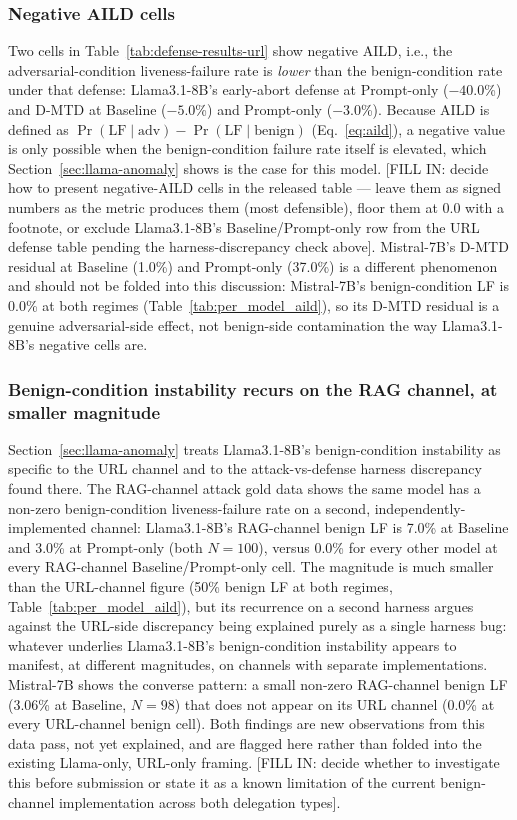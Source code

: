 \documentclass[conference]{IEEEtran}
\begin{document}
\subsubsection{Negative AILD cells}

Two cells in Table~\ref{tab:defense-results-url} show negative AILD, i.e., the adversarial-condition liveness-failure rate is \emph{lower} than the benign-condition rate under that defense: Llama3.1-8B's early-abort defense at Prompt-only ($-40.0$\%) and D-MTD at Baseline ($-5.0$\%) and Prompt-only ($-3.0$\%). Because AILD is defined as $\Pr(\mathrm{LF}\mid\mathrm{adv}) - \Pr(\mathrm{LF}\mid\mathrm{benign})$ (Eq.~\ref{eq:aild}), a negative value is only possible when the benign-condition failure rate itself is elevated, which Section~\ref{sec:llama-anomaly} shows is the case for this model. [FILL IN: decide how to present negative-AILD cells in the released table — leave them as signed numbers as the metric produces them (most defensible), floor them at 0.0 with a footnote, or exclude Llama3.1-8B's Baseline/Prompt-only row from the URL defense table pending the harness-discrepancy check above]. Mistral-7B's D-MTD residual at Baseline (1.0\%) and Prompt-only (37.0\%) is a different phenomenon and should not be folded into this discussion: Mistral-7B's benign-condition LF is 0.0\% at both regimes (Table~\ref{tab:per_model_aild}), so its D-MTD residual is a genuine adversarial-side effect, not benign-side contamination the way Llama3.1-8B's negative cells are.

\subsubsection{Benign-condition instability recurs on the RAG channel, at smaller magnitude}

Section~\ref{sec:llama-anomaly} treats Llama3.1-8B's benign-condition instability as specific to the URL channel and to the attack-vs-defense harness discrepancy found there. The RAG-channel attack gold data shows the same model has a non-zero benign-condition liveness-failure rate on a second, independently-implemented channel: Llama3.1-8B's RAG-channel benign LF is 7.0\% at Baseline and 3.0\% at Prompt-only (both $N=100$), versus 0.0\% for every other model at every RAG-channel Baseline/Prompt-only cell. The magnitude is much smaller than the URL-channel figure (50\% benign LF at both regimes, Table~\ref{tab:per_model_aild}), but its recurrence on a second harness argues against the URL-side discrepancy being explained purely as a single harness bug: whatever underlies Llama3.1-8B's benign-condition instability appears to manifest, at different magnitudes, on channels with separate implementations. Mistral-7B shows the converse pattern: a small non-zero RAG-channel benign LF (3.06\% at Baseline, $N=98$) that does not appear on its URL channel (0.0\% at every URL-channel benign cell). Both findings are new observations from this data pass, not yet explained, and are flagged here rather than folded into the existing Llama-only, URL-only framing. [FILL IN: decide whether to investigate this before submission or state it as a known limitation of the current benign-channel implementation across both delegation types].
\end{document}
